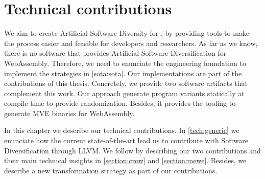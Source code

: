 \chapter{Technical contributions}
\label{chapter:technical}


We aim to create Artificial Software Diversity for \wasm, by providing tools to make the process easier and feasible for developers and researchers. As far as we know, there is no software that provides Artificial Software Diversification for WebAssembly. Therefore, we need to enunciate the engineering foundation to implement the strategies in \autoref{sota:sota}. Our implementations are part of the contributions of this thesis. Concretely, we provide two software artifacts that complement this work. Our approach generate \wasm program variants statically at compile time to provide randomization. Besides, it provides the tooling to generate MVE binaries for WebAssembly.


In this chapter we describe our technical contributions. In \autoref{tech:generic} we enunciate how the current state-of-the-art lead us to contribute with Software Diversification through LLVM. We follow by describing our two contributions and their main technical insights in \autoref{section:crow} and \autoref{section:mewe}. Besides, we describe a new transformation strategy as part of our contributions. 















